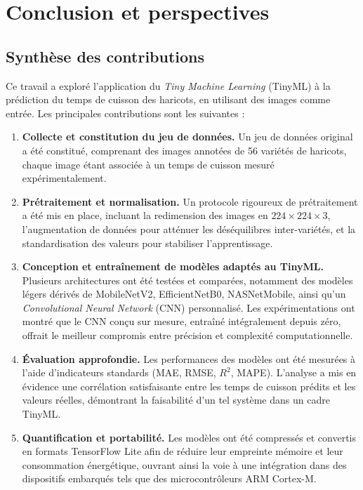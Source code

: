 \chapter{Conclusion et perspectives}
\label{chap:conclusion_et_perspectives}

\section{Synthèse des contributions}
\label{sec:synthese_contributions}

Ce travail a exploré l'application du \textit{Tiny Machine Learning} (TinyML) à la prédiction du temps de cuisson des haricots, en utilisant des images comme entrée. Les principales contributions sont les suivantes :

\begin{enumerate}
	\item \textbf{Collecte et constitution du jeu de données.} Un jeu de données original a été constitué, comprenant des images annotées de 56 variétés de haricots, chaque image étant associée à un temps de cuisson mesuré expérimentalement.
	\item \textbf{Prétraitement et normalisation.} Un protocole rigoureux de prétraitement a été mis en place, incluant la redimension des images en \(224 \times 224 \times 3\), l'augmentation de données pour atténuer les déséquilibres inter-variétés, et la standardisation des valeurs pour stabiliser l'apprentissage.
	\item \textbf{Conception et entraînement de modèles adaptés au TinyML.} Plusieurs architectures ont été testées et comparées, notamment des modèles légers dérivés de MobileNetV2, EfficientNetB0, NASNetMobile, ainsi qu'un \textit{Convolutional Neural Network} (CNN) personnalisé. Les expérimentations ont montré que le CNN conçu sur mesure, entraîné intégralement depuis zéro, offrait le meilleur compromis entre précision et complexité computationnelle.
	\item \textbf{Évaluation approfondie.} Les performances des modèles ont été mesurées à l'aide d'indicateurs standards (MAE, RMSE, \(R^2\), MAPE). L'analyse a mis en évidence une corrélation satisfaisante entre les temps de cuisson prédits et les valeurs réelles, démontrant la faisabilité d'un tel système dans un cadre TinyML.
	\item \textbf{Quantification et portabilité.} Les modèles ont été compressés et convertis en formats TensorFlow Lite afin de réduire leur empreinte mémoire et leur consommation énergétique, ouvrant ainsi la voie à une intégration dans des dispositifs embarqués tels que des microcontrôleurs ARM Cortex-M.
\end{enumerate}

